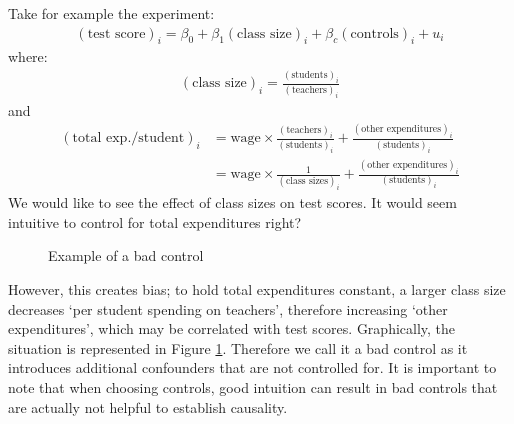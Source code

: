             \begin{example}
                Take for example the experiment:
                \begin{align}
                    (\text{test score})_i = \beta_0 + \beta_1(\text{class size})_i +\beta_c(\text{controls})_i+u_i
                \end{align}
                where:
                \begin{align}
                    (\text{class size})_i = \frac{(\text{students})_i}{(\text{teachers})_i}
                \end{align}
                and
                \begin{align}
                    (\text{total exp./student})_i
                        &= \text{wage}\times \frac{(\text{teachers})_i }{(\text{students})_i}+\frac{(\text{other expenditures})_i }{(\text{students})_i}\\
                        &= \text{wage}\times \frac{1}{(\text{class sizes})_i}+\frac{(\text{other expenditures})_i }{(\text{students})_i}
                \end{align}
                We would like to see the effect of class sizes on test scores. It would seem intuitive to control for total expenditures right? 
                \begin{figure}[h]
                    \centering
                    
                    \caption{Example of a bad control}
                    \label{fig:research/bad_control/example}
                \end{figure}
    	       
                However, this creates bias; to hold total expenditures constant, a larger class size decreases ‘per student spending on teachers', therefore increasing `other expenditures', which may be correlated with test scores. Graphically, the situation is represented in Figure \ref{fig:research/bad_control/example}. Therefore we call it a bad control as it introduces additional confounders that are not controlled for. It is important to note that when choosing controls, good intuition can result in bad controls that are actually not helpful to establish causality.
            \end{example}

